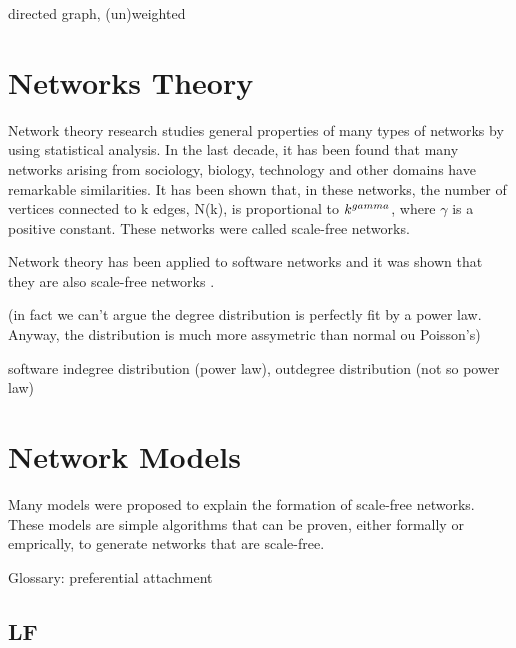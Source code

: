 directed graph, (un)weighted

\section{Networks Theory}

Network theory research studies general properties of many types of networks by
using statistical analysis. In the last decade, it has been found that many
networks arising from sociology, biology, technology and other domains have
remarkable similarities. It has been shown that, in these networks, the number
of vertices connected to k edges, N(k), is proportional to $k^{\-gamma}$, where
$\gamma$ is a positive constant. These networks were called scale-free networks.

Network theory has been applied to software networks and it was shown that they
are also scale-free networks \cite{Myers2003,Valverde2003}.

(in fact we can't argue the degree distribution is perfectly fit by a power law.
Anyway, the distribution is much more assymetric than normal ou Poisson's)

software indegree distribution (power law), outdegree distribution (not so power
law)

\section{Network Models}

Many models were proposed to explain the formation of scale-free networks. These
models are simple algorithms that can be proven, either formally or emprically,
to generate networks that are scale-free.


Glossary: preferential attachment



\subsection{LF}


